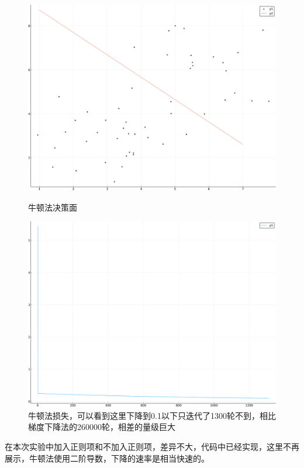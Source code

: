 \documentclass{ML}
\begin{document}
\begin{figure}[H]
	\begin{minipage}[c]{0.5\linewidth}
		\centering
		\includegraphics[width=0.9\linewidth]{media/Logistic/newtown-plot}
		\caption{牛顿法决策面}
		\label{fig:newtown-plot}
	\end{minipage}
	\begin{minipage}[c]{0.5\linewidth}
		\centering
		\includegraphics[width=0.9\linewidth]{media/Logistic/newtown-loss}
		\caption{牛顿法损失，可以看到这里下降到0.1以下只迭代了1300轮不到，相比梯度下降法的260000轮，相差的量级巨大}
		\label{fig:newtown-loss}
	\end{minipage}
\end{figure}

在本次实验中加入正则项和不加入正则项，差异不大，代码中已经实现，这里不再展示，牛顿法使用二阶导数，下降的速率是相当快速的。
\end{document}
